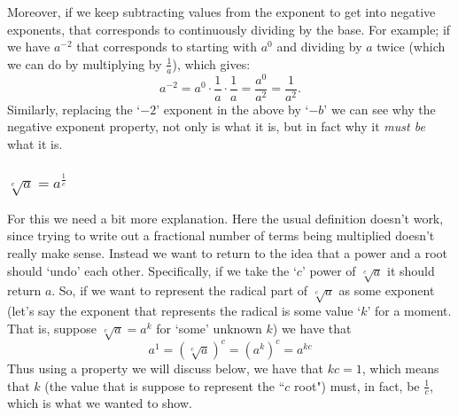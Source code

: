 \documentclass{ximeraXloud}
\begin{document}
        Moreover, if we keep subtracting values from the exponent to get into negative exponents, that corresponds to continuously dividing by the base. For example; if we have $a^{-2}$ that corresponds to starting with $a^0$ and dividing by $a$ twice (which we can do by multiplying by $\frac{1}{a}$), which gives:
        \[
            a^{-2} = a^0 \cdot \frac{1}{a} \cdot \frac{1}{a} = \frac{a^0}{a^2} = \frac{1}{a^2}.
        \]
        Similarly, replacing the `$-2$' exponent in the above by `$-b$' we can see why the negative exponent property, not only is what it is, but in fact why it \textit{must be} what it is.

    \subsubsection*{$\sqrt[c]{a} = a^{\frac{1}{c}}$}
    
        For this we need a bit more explanation. Here the usual definition doesn't work, since trying to write out a fractional number of terms being multiplied doesn't really make sense. Instead we want to return to the idea that a power and a root should `undo' each other. Specifically, if we take the `$c$' power of $\sqrt[c]{a}$ it should return $a$. So, if we want to represent the radical part of $\sqrt[c]{a}$ as some exponent (let's say the exponent that represents the radical is some value `$k$' for a moment. That is, suppose $\sqrt[c]{a} = a^k$ for `some' unknown $k$) we have that 
        \[
            a^1 = \left(\sqrt[c]{a}\right)^c = \left(a^k\right)^c = a^{kc}
        \]
        Thus using a property we will discuss below, we have that $kc = 1$, which means that $k$ (the value that is suppose to represent the ``$c$ root") must, in fact, be $\frac{1}{c}$, which is what we wanted to show.

\end{document}
